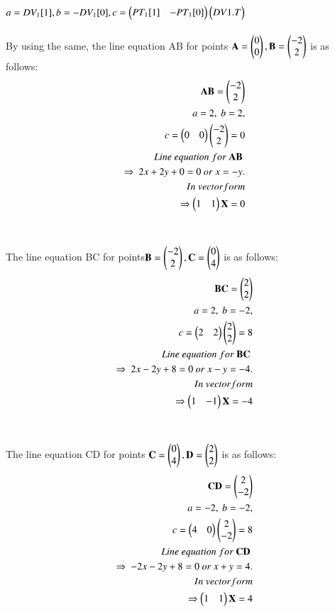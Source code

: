 \documentclass[journal,12pt,twocolumn]{IEEEtran}
\begin{document}
$a= DV_1[1],\\ b=-DV_1[0],\\ c = \begin{pmatrix}PT_1[1]&-PT_1[0]\end{pmatrix} \begin{pmatrix}DV1.T\end{pmatrix}$
\\
\\
By using the same, the line equation AB for points $\mathbf{A} = \begin{pmatrix}0\\0\end{pmatrix},\mathbf{B}=\begin{pmatrix}-2\\2\end{pmatrix}$ is as follows:
\\
\begin{align}
\begin{split}
\mathbf{AB} = \begin{pmatrix}-2\\2\end{pmatrix}\\
a=2,\ b=2,\\
c=\begin{pmatrix}0 & 0\end{pmatrix} \begin{pmatrix}-2\\2\end{pmatrix}=0\\
Line\ equation\ for\ \mathbf{AB}\ \\ \Rightarrow\ 2x+2y+0=0 \ or \ x=-y. \\
In\ vector form\\
\Rightarrow \begin{pmatrix}1&1\end{pmatrix}\mathbf{X}=0\\
\end{split}
\end{align}
\\
\\
The line equation BC for points$\mathbf{B} = \begin{pmatrix}-2\\2\end{pmatrix},\mathbf{C}=\begin{pmatrix}0\\4\end{pmatrix}$ is as follows:
\\
\begin{align}
\begin{split}
\mathbf{BC} = \begin{pmatrix}2\\2\end{pmatrix}\\
a=2,\ b=-2,\\
c=\begin{pmatrix}2 & 2\end{pmatrix} \begin{pmatrix}2\\2\end{pmatrix}=8\\
Line\ equation\ for\ \mathbf{BC}\ \\ \Rightarrow\ 2x-2y+8=0 \ or \ x-y=-4. \\
In\ vector form\\
\Rightarrow \begin{pmatrix}1&-1\end{pmatrix}\mathbf{X}=-4
\end{split}
\end{align}
\\
\\
The line equation CD for points $\mathbf{C}=\begin{pmatrix}0\\4\end{pmatrix},\mathbf{D} = \begin{pmatrix}2\\2\end{pmatrix}$ is as follows:
\\
\begin{align}
\begin{split}
\mathbf{CD} = \begin{pmatrix}2\\-2\end{pmatrix}\\
a=-2,\ b=-2,\\
c=\begin{pmatrix}4 & 0\end{pmatrix} \begin{pmatrix}2\\-2\end{pmatrix}=8\\
Line\ equation\ for\ \mathbf{CD}\ \\ \Rightarrow\ -2x-2y+8=0 \ or \ x+y=4. \\
In\ vector form\\
\Rightarrow \begin{pmatrix}1&1\end{pmatrix}\mathbf{X}=4
\end{split}
\end{align}
\end{document}
